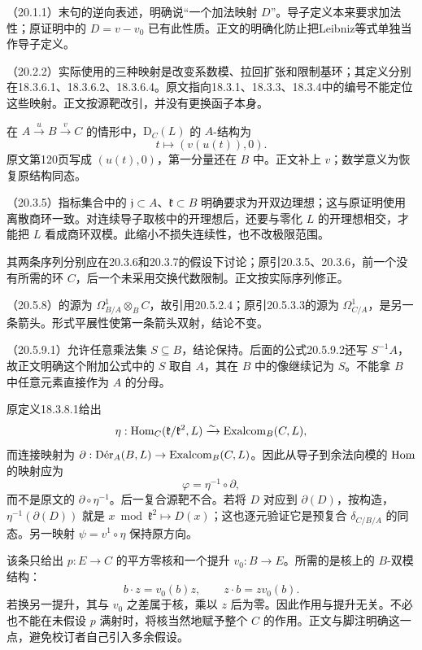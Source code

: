 （20.1.1）末句的逆向表述，明确说“一个加法映射 $D$”。导子定义本来要求加法性；原证明中的 $D=v-v_0$ 已有此性质。正文的明确化防止把Leibniz等式单独当作导子定义。

（20.2.2）实际使用的三种映射是改变系数模、拉回扩张和限制基环；其定义分别在18.3.6.1、18.3.6.2、18.3.6.4。原文指向18.3.1、18.3.3、18.3.4中的编号不能定位这些映射。正文按源靶改引，并没有更换函子本身。

在 $A\xrightarrow u B\xrightarrow v C$ 的情形中，$\mathrm D_C(L)$ 的 $A$-结构为
\[
 t\longmapsto(v(u(t)),0).
\]
原文第120页写成 $(u(t),0)$，第一分量还在 $B$ 中。正文补上 $v$；数学意义为恢复原结构同态。

（20.3.5）指标集合中的 $\mathfrak j\subset A$、$\mathfrak k\subset B$ 明确要求为开双边理想；这与原证明使用离散商环一致。对连续导子取核中的开理想后，还要与零化 $L$ 的开理想相交，才能把 $L$ 看成商环双模。此缩小不损失连续性，也不改极限范围。

其两条序列分别应在20.3.6和20.3.7的假设下讨论；原引20.3.5、20.3.6，前一个没有所需的环 $C$，后一个未采用交换代数限制。正文按实际序列修正。

（20.5.8）的源为 $\Omega^1_{B/A}\otimes_B C$，故引用20.5.2.4；原引20.5.3.3的源为 $\Omega^1_{C/A}$，是另一条箭头。形式平展性使第一条箭头双射，结论不变。

（20.5.9.1）允许任意乘法集 $S\subseteq B$，结论保持。后面的公式20.5.9.2还写 $S^{-1}A$，故正文明确这个附加公式中的 $S$ 取自 $A$，其在 $B$ 中的像继续记为 $S$。不能拿 $B$ 中任意元素直接作为 $A$ 的分母。

原定义18.3.8.1给出
\[
 \eta:\Hom_C(\mathfrak k/\mathfrak k^2,L)
 \xrightarrow{\sim}\Exalcom_B(C,L),
\]
而连接映射为 $\partial:\Der_A(B,L)\to\Exalcom_B(C,L)$。因此从导子到余法向模的 $\Hom$ 的映射应为
\[
 \varphi=\eta^{-1}\circ\partial,
\]
而不是原文的 $\partial\circ\eta^{-1}$。后一复合源靶不合。若将 $D$ 对应到 $\partial(D)$，按构造，$\eta^{-1}(\partial(D))$ 就是 $x\bmod\mathfrak k^2\mapsto D(x)$；这也逐元验证它是预复合 $\delta_{C/B/A}$ 的同态。另一映射 $\psi=v^1\circ\eta$ 保持原方向。

该条只给出 $p:E\to C$ 的平方零核和一个提升 $v_0:B\to E$。所需的是核上的 $B$-双模结构：
\[
 b\cdot z=v_0(b)z,\qquad z\cdot b=zv_0(b).
\]
若换另一提升，其与 $v_0$ 之差属于核，乘以 $z$ 后为零。因此作用与提升无关。不必也不能在未假设 $p$ 满射时，将核当然地赋予整个 $C$ 的作用。正文与脚注明确这一点，避免校订者自己引入多余假设。

